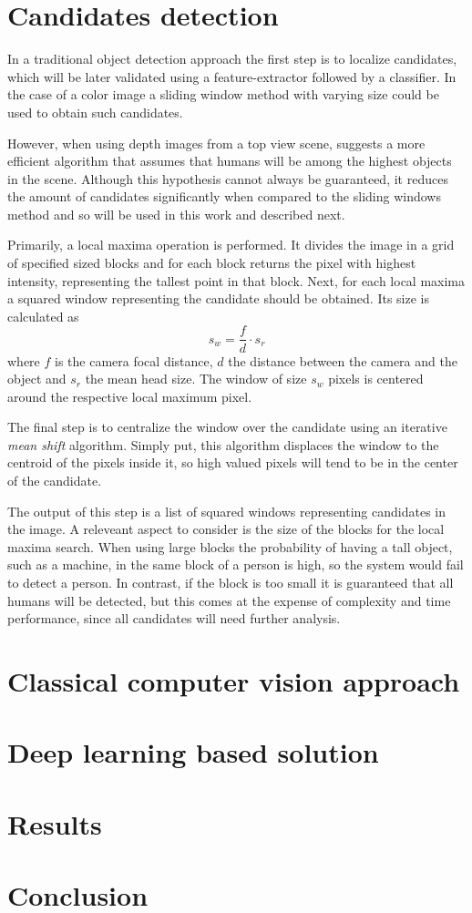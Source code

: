 \section{Candidates detection}
\label{sec:candidates}

    In a traditional object detection approach \cite{traditional-objdetect} the first step is to localize candidates, which will be later validated using a feature-extractor followed by a classifier. In the case of a color image a sliding window method with varying size could be used to obtain such candidates.

    However, when using depth images from a top view scene, \cite{rauter} suggests a more efficient algorithm that assumes that humans will be among the highest objects in the scene. Although this hypothesis cannot always be guaranteed, it reduces the amount of candidates significantly when compared to the sliding windows method and so will be used in this work and described next.

    Primarily, a local maxima operation is performed. It divides the image in a grid of specified sized blocks and for each block returns the pixel with highest intensity, representing the tallest point in that block. Next, for each local maxima a squared window representing the candidate should be obtained. Its size is calculated as
    \begin{equation}
      s_w = \frac{f}{d} \cdot s_r
    \end{equation}
    where $f$ is the camera focal distance, $d$ the distance between the camera and the object and $s_r$ the mean head size. The window of size $s_w$ pixels is centered around the respective local maximum pixel.

    The final step is to centralize the window over the candidate using an iterative \textit{mean shift} algorithm. Simply put, this algorithm displaces the window to the centroid of the pixels inside it, so high valued pixels will tend to be in the center of the candidate.

    The output of this step is a list of squared windows representing candidates in the image. A releveant aspect to consider is the size of the blocks for the local maxima search. When using large blocks the probability of having a tall object, such as a machine, in the same block of a person is high, so the system would fail to detect a person. In contrast, if the block is too small it is guaranteed that all humans will be detected, but this comes at the expense of complexity and time performance, since all candidates will need further analysis.

\section{Classical computer vision approach}
\label{sec:classical}



\section{Deep learning based solution}
\label{sec:deep}

\section{Results}
\label{sec:results}

\section{Conclusion}
\label{sec:conclusion}
